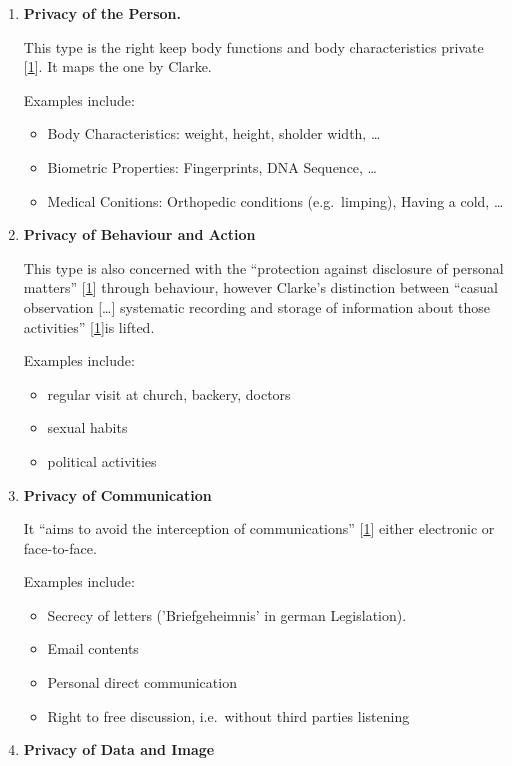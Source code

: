 \begin{enumerate}

\item \textbf{Privacy of the Person.}

This type is the right keep body functions and body characteristics
private {[}\hyperref[references]{1}{]}. It maps the one by Clarke.

Examples include:
\begin{itemize}
\item Body Characteristics: weight, height, sholder width, \ldots
\item Biometric Properties: Fingerprints, DNA Sequence, \ldots
\item Medical Conitions: Orthopedic conditions (e.g.~limping), Having a cold, \ldots
\end{itemize}

\item \textbf{Privacy of Behaviour and Action}

This type is also concerned with the ``protection against disclosure of personal matters'' {[}\hyperref[references]{1}{]} through behaviour, however Clarke's distinction between ``casual observation {[}\ldots{}{]} systematic recording and storage of information about those activities'' {[}\hyperref[references]{1}{]}is lifted.

Examples include:
\begin{itemize}
\item regular visit at church, backery, doctors
\item sexual habits
\item political activities
\end{itemize}

\item \textbf{Privacy of Communication}

It ``aims to avoid the interception of communications'' {[}\hyperref[references]{1}{]} either electronic or face-to-face.

Examples include:
\begin{itemize}
\item Secrecy of letters ('Briefgeheimnis' in german Legislation).
\item Email contents
\item Personal direct communication
\item Right to free discussion, i.e.~without third parties listening
\end{itemize}

\item \textbf{Privacy of Data and Image}


\end{enumerate}
